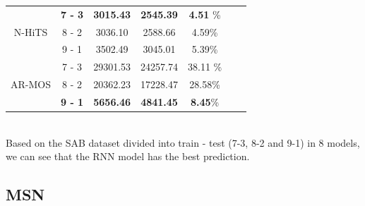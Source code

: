 \documentclass{ieeeojies}
\begin{document}
{\begin{tabular}{|c|c|c|c|c|c|c|}
     \hline
     \multirow{3}{*}{N-HiTS} & \textbf{7 - 3} & \textbf{3015.43} & \textbf{2545.39} & \textbf{4.51} \%\\
      \cline{2-5}
     & 8 - 2 & 3036.10 & 2588.66 & 4.59\% \\
      \cline{2-5}
     & 9 - 1 & 3502.49 & 3045.01 & 5.39\% \\
       \hline
     \multirow{3}{*}{AR-MOS} & 7 - 3 & 29301.53 & 24257.74 & 38.11 \%\\
      \cline{2-5}
     & 8 - 2 & 20362.23 & 17228.47 & 28.58\% \\
      \cline{2-5}
     & \textbf{9 - 1} & \textbf{5656.46} & \textbf{4841.45} & \textbf{8.45}\% \\
     \hline
     \end{tabular}%
     }
     
     \\ Based on the SAB dataset divided into train - test (7-3, 8-2 and 9-1) in 8 models, we can see that the RNN model has the best prediction.
\subsection{MSN}
\end{document}
